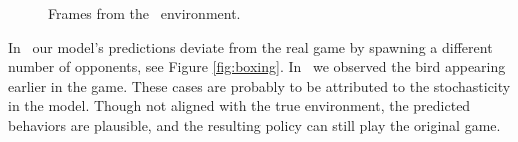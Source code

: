 \begin{figure}[htbp]
%
\hfill  

\caption{Frames from the \pong\ environment. }
\label{fig:pong}
\end{figure}


In \kungfumaster\, our model's predictions deviate from the real game by spawning a different number of opponents, see Figure \ref{fig:boxing}. In \crazyclimber\, we observed the bird appearing earlier in the game. These cases are probably to be attributed to the stochasticity in the model. Though not aligned with the true environment, the predicted behaviors are plausible, and the resulting policy can still play the original game.

